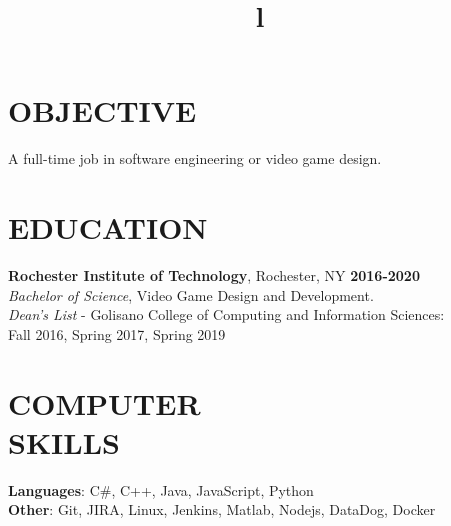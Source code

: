 \documentclass[line,margin]{res}
\begin{document}

\noindent
\makebox[0pt][l]{}%
\makebox[\textwidth][c]{}%
\makebox[0pt][l]{}%
\makebox[\textwidth][c]{}%
\makebox[0pt][l]{}%
\makebox[\textwidth][c]{}%

\begin{resume}

\section{OBJECTIVE}
A full-time job in software engineering or video game design.

\section{EDUCATION}
\textbf{Rochester Institute of Technology}, Rochester, NY\hfill
    \textbf{2016-2020}\\
{\sl Bachelor of Science}, Video Game Design and Development.
\\
{\sl Dean's List} - Golisano College of Computing and Information Sciences:\hfill \\ Fall 2016, Spring 2017, Spring 2019
\section{COMPUTER\\SKILLS}
\textbf{Languages}: C\#, C++, Java, JavaScript, Python \\
\textbf{Other}: Git, JIRA, Linux, Jenkins, Matlab, Nodejs, DataDog, Docker
\begin{format}
\title{l}\\
\\
\body\\
\end{format}

\end{resume}
\end{document}
